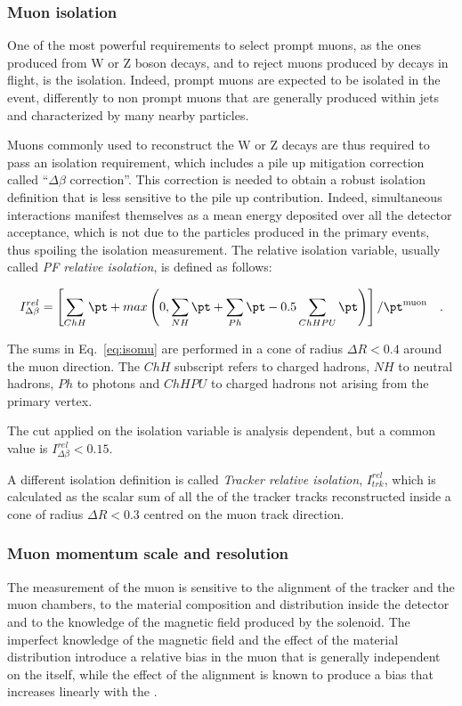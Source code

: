 \subsubsection{Muon isolation}
One of the most powerful requirements to select prompt muons, as the ones produced from W or Z boson decays, and to reject muons produced by decays in flight, is the isolation. Indeed, prompt muons are expected to be isolated in the event, differently to non prompt muons that are generally produced within jets and characterized by many nearby particles.

Muons commonly used to reconstruct the W or Z decays are thus required to pass an isolation requirement, which includes a pile up mitigation correction called ``$\Delta\beta$ correction''. This correction is needed to obtain a robust isolation definition that is less sensitive to the pile up contribution. Indeed, simultaneous interactions manifest themselves as a mean energy deposited over all the detector acceptance, which is not due to the particles produced in the primary events, thus spoiling the isolation measurement. The relative isolation variable, usually called \emph{PF relative isolation}, is defined as follows:

\begin{equation}\label{eq:isomu}
I^{rel}_{\Delta\beta} = \left[  \sum_{ChH}\pt + max\left(0, \sum_{NH}\pt + \sum_{Ph}\pt - 0.5\sum_{ChHPU}\pt    \right)  \right]/\pt^\mathrm{muon} \quad .
\end{equation}

The sums in Eq.~\eqref{eq:isomu} are performed in a cone of radius $\Delta R < 0.4$ around the muon direction. The $ChH$ subscript refers to charged hadrons, $NH$ to neutral hadrons, $Ph$ to photons and $ChHPU$ to charged hadrons not arising from the primary vertex.

The cut applied on the isolation variable is analysis dependent, but a common value is $I^{rel}_{\Delta\beta} < 0.15$.

A different isolation definition is called \emph{Tracker relative isolation}, $I^{rel}_{trk}$, which is calculated as the scalar sum of all the \pt of the tracker tracks reconstructed inside a cone of radius $\Delta R < 0.3$ centred on the muon track direction.

\subsubsection{Muon momentum scale and resolution}
The measurement of the muon \pt is sensitive to the alignment of the tracker and the muon chambers, to the material composition and distribution inside the detector and to the knowledge of the magnetic field produced by the solenoid. The imperfect knowledge of the magnetic field and the effect of the material distribution introduce a relative bias in the muon \pt that is generally independent on the \pt itself, while the effect of the alignment is known to produce a bias that increases linearly with the \pt.

